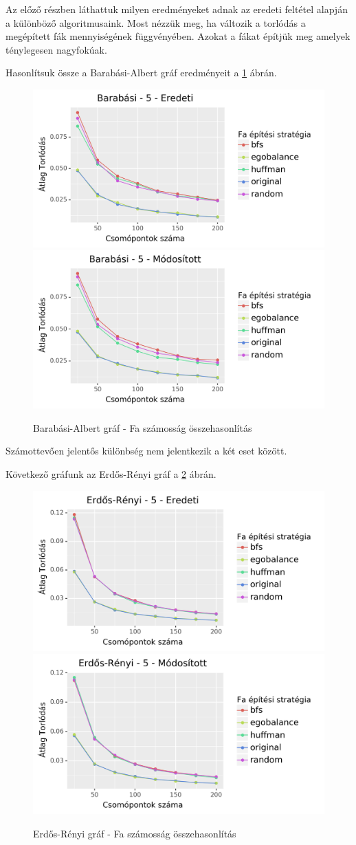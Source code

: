 \documentclass[12pt]{report}
\begin{document}
Az előző részben láthattuk milyen eredményeket adnak az eredeti feltétel alapján a különböző algoritmusaink.
Most nézzük meg, ha változik a torlódás a megépített fák mennyiségének függvényében. 
Azokat a fákat építjük meg amelyek ténylegesen nagyfokúak.

Hasonlítsuk össze a Barabási-Albert gráf eredményeit a \ref{barabasi-tree-difference-con} ábrán.

\begin{figure}[H]
	\begin{center}
		\includegraphics[width=0.49\linewidth]{pictures/barabasi_con_e.png}
		\includegraphics[width=0.49\linewidth]{pictures/barabasi_con_m.png}
		\caption{Barabási-Albert gráf - Fa számosság összehasonlítás}
		\label{barabasi-tree-difference-con}
	\end{center}
\end{figure}

Számottevően jelentős különbség nem jelentkezik a két eset között.

Következő gráfunk az Erdős-Rényi gráf a \ref{erdos-tree-difference-con} ábrán.

\begin{figure}[H]
	\begin{center}
		\includegraphics[width=0.49\linewidth]{pictures/erdos_con_e.png}
		\includegraphics[width=0.49\linewidth]{pictures/erdos_con_m.png}
		\caption{Erdős-Rényi gráf - Fa számosság összehasonlítás}
		\label{erdos-tree-difference-con}
	\end{center}
\end{figure}
\end{document}
